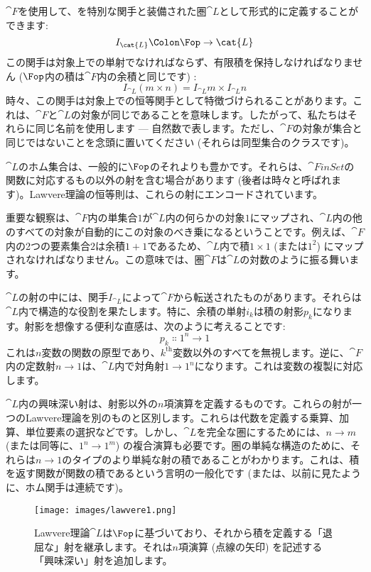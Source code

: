 $\cat{F}$を使用して、を特別な関手と装備された圏$\cat{L}$として形式的に定義することができます: 
\[I_{\cat{L}} \Colon \Fop \to \cat{L}\]
この関手は対象上での単射でなければならず、有限積を保持しなければなりません ($\Fop$内の積は$\cat{F}$内の余積と同じです) : 
\[I_{\cat{L}} (m\times{}n) = I_{\cat{L}} m\times{}I_{\cat{L}} n\]
時々、この関手は対象上での恒等関手として特徴づけられることがあります。これは、$\cat{F}$と$\cat{L}$の対象が同じであることを意味します。したがって、私たちはそれらに同じ名前を使用します --- 自然数で表します。ただし、$\cat{F}$の対象が集合と同じではないことを念頭に置いてください (それらは同型集合のクラスです)。

$\cat{L}$のホム集合は、一般的に$\Fop$のそれよりも豊かです。それらは、$\cat{FinSet}$の関数に対応するもの以外の射を含む場合があります (後者は時々と呼ばれます)。Lawvere理論の恒等則は、これらの射にエンコードされています。

重要な観察は、$\cat{F}$内の単集合$1$が$\cat{L}$内の何らかの対象$1$にマップされ、$\cat{L}$内の他のすべての対象が自動的にこの対象のべき乗になるということです。例えば、$\cat{F}$内の2つの要素集合$2$は余積$1 + 1$であるため、$\cat{L}$内で積$1 \times 1$ (または$1^2$) にマップされなければなりません。この意味では、圏$\cat{F}$は$\cat{L}$の対数のように振る舞います。

$\cat{L}$の射の中には、関手$I_{\cat{L}}$によって$\cat{F}$から転送されたものがあります。それらは$\cat{L}$内で構造的な役割を果たします。特に、余積の単射$i_k$は積の射影$p_k$になります。射影を想像する便利な直感は、次のように考えることです: 
\[p_k \Colon 1^n \to 1\]
これは$n$変数の関数の原型であり、$k^\text{th}$変数以外のすべてを無視します。逆に、$\cat{F}$内の定数射$n \to 1$は、$\cat{L}$内で対角射$1 \to 1^n$になります。これは変数の複製に対応します。

$\cat{L}$内の興味深い射は、射影以外の$n$項演算を定義するものです。これらの射が一つのLawvere理論を別のものと区別します。これらは代数を定義する乗算、加算、単位要素の選択などです。しかし、$\cat{L}$を完全な圏にするためには、$n \to m$ (または同等に、$1^n \to 1^m$) の複合演算も必要です。圏の単純な構造のために、それらは$n \to 1$のタイプのより単純な射の積であることがわかります。これは、積を返す関数が関数の積であるという言明の一般化です (または、以前に見たように、ホム関手は連続です)。

\begin{figure}[H]
  \centering
  \texttt{[image: images/lawvere1.png]}
  \caption{Lawvere理論$\cat{L}$は$\Fop$に基づいており、それから積を定義する「退屈な」射を継承します。それは$n$項演算 (点線の矢印) を記述する「興味深い」射を追加します。}
\end{figure}

